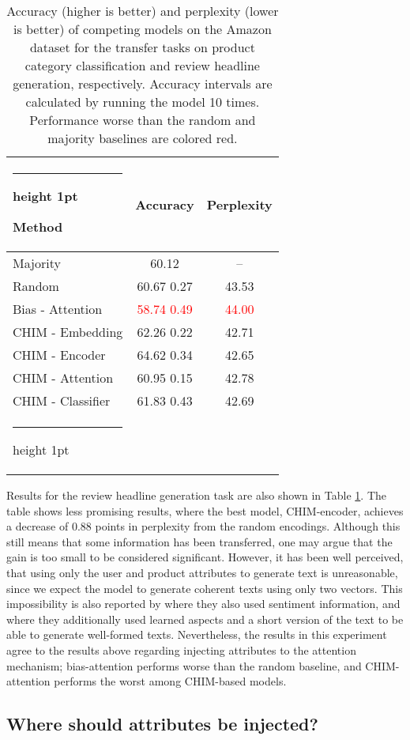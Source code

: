 \documentclass[11pt,a4paper]{article}
\makeatletter
\newcommand{\thickhline}{\noalign {\ifnum 0=`}\fi \hrule height 1pt
    \futurelet \reserved@a \@xhline
}
\makeatother
\begin{document}
\begin{table}[t]
  \centering
    \begin{tabular}{@{~}lcc @{~}}
    \thickhline
    Method & Accuracy & Perplexity \\
    \hline
    Majority & 60.12 & -- \\
    Random & 60.67  0.27 & 43.53 \\
    Bias - Attention & \textcolor{red}{58.74  0.49} & \textcolor{red}{44.00} \\
    CHIM - Embedding & 62.26  0.22 & 42.71\\
    CHIM - Encoder & 64.62  0.34 & 42.65\\
    CHIM - Attention & 60.95  0.15 & 42.78\\
    CHIM - Classifier & 61.83  0.43 & 42.69\\
    \thickhline
    \end{tabular}\caption{Accuracy (higher is better) and perplexity (lower is better) of competing models on the Amazon dataset for the transfer tasks on product category classification and review headline generation, respectively. Accuracy intervals are calculated by running the model 10 times. Performance worse than the random and majority baselines are colored red.}
  \label{tab:transfer_results}\end{table}

Results for the review headline generation task are also shown in Table \ref{tab:transfer_results}. The table shows less promising results, where the best model, CHIM-encoder, achieves a decrease of 0.88 points in perplexity from the random encodings.
Although this still means that some information has been transferred, one may argue that the gain is too small to be considered significant.
However, it has been well perceived, that using only the user and product attributes to generate text is unreasonable, since we expect the model to generate coherent texts using only two vectors. This impossibility is also reported by \citet{dong2017learning} where they also used sentiment information, and \citet{ni2018personalized} where they additionally used learned aspects and a short version of the text to be able to generate well-formed texts.
Nevertheless, the results in this experiment agree to the results above regarding injecting attributes to the attention mechanism; bias-attention performs worse than the random baseline, and CHIM-attention performs the worst among CHIM-based models.

\subsection{Where should attributes be injected?}
\end{document}
